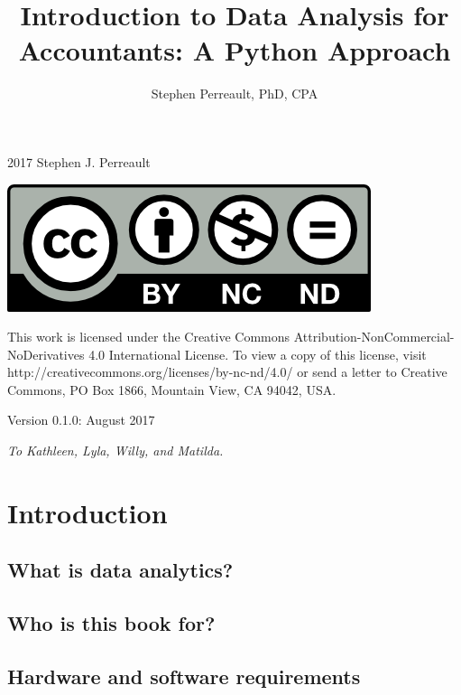 \documentclass{book}
\begin{document}
\frontmatter
\pagestyle{plain}
\begin{titlepage}
	\title {\huge \textbf{Introduction to Data Analysis for Accountants: A Python Approach}}
	\date{}
	\author{Stephen Perreault, PhD, CPA}
	\maketitle
\end{titlepage}
\begingroup
	\parindent 0pt
	\parskip \baselineskip 
	\textcopyright{} 2017 Stephen J. Perreault 
	
	\begin {center}
	\includegraphics  [scale=1.5]{creative_commons_license}
	\end {center}
	
	This work is licensed under the Creative Commons Attribution-NonCommercial-NoDerivatives 4.0 International License. To view a copy of this license, visit http://creativecommons.org/licenses/by-nc-nd/4.0/ or send a letter to Creative Commons, PO Box 1866, Mountain View, CA 94042, USA.
	
	Version 0.1.0: August 2017
\endgroup
\tableofcontents

\begin {center}
\newpage
\textit{
To Kathleen, Lyla, Willy, and Matilda.}
\end {center}

\mainmatter	
\parindent 0pt
\parskip \baselineskip 

\chapter{Introduction}
\section{What is data analytics?}
\section{Who is this book for?}
\section{Hardware and software requirements}
\end{document}
